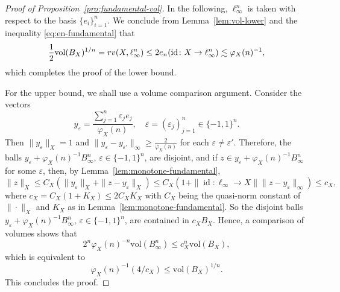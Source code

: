 \documentclass[10pt,a4paper]{amsart}
\DeclareMathOperator{\id}{id}
\newcommand{\vol}{\mathrm{vol}}
\begin{document}
\begin{proof}[Proof of Proposition~\ref{pro:fundamental-vol}]

In the following, $\ell_{\infty}^n$ is taken with respect to the basis $\{e_i\}_{i=1}^n$. We conclude from Lemma~\ref{lem:vol-lower} and the inequality \eqref{eq:en-fundamental} that
\[
\frac{1}{2}\vol(B_X)^{1/n}
={\rm rv}(X,\ell_{\infty}^n)
\le 2 e_n(\id\colon X\to \ell_{\infty}^n)
\lesssim \varphi_X(n)^{-1},
\]
which completes the proof of the lower bound.

For the upper bound, we shall use a volume comparison argument. Consider the vectors 
\[
y_{\varepsilon}=\frac{\sum_{j=1}^{n}\varepsilon_je_j}{\varphi_X(n)} ,\quad \varepsilon=(\varepsilon_j)_{j=1}^n\in \{-1,1\}^n.
\]
Then $\|y_{\varepsilon}\|_X=1$ and $\|y_{\varepsilon}-y_{\varepsilon'}\|_{\infty}\ge \frac{2}{\varphi_X(n)}$ for each $\varepsilon\neq \varepsilon'$. Therefore, the balls $y_{\varepsilon}+\varphi_X(n)^{-1}B_{\infty}^n$, $\varepsilon\in\{-1,1\}^n$, are disjoint, and if $z\in y_{\varepsilon}+\varphi_X(n)^{-1}B_{\infty}^n$ for some $\varepsilon$, then, by Lemma~\ref{lem:monotone-fundamental}, 
\[
\|z\|_X
\le C_X(\|y_{\varepsilon}\|_X + \|z-y_{\varepsilon}\|_X)
\le C_X(1 + \|\id\colon \ell_{\infty}\to X \|\|z-y_{\varepsilon}\|_{\infty})
\le c_X,
\]
where $c_X=C_X(1+K_X)\le 2C_X K_X$ with $C_X$ being the quasi-norm constant of $\|\cdot\|_X$ and $K_X$ as in Lemma~\ref{lem:monotone-fundamental}.
So the disjoint balls $y_{\varepsilon}+\varphi_X(n)^{-1}B_{\infty}^n$, $\varepsilon\in\{-1,1\}^n$, are contained in $c_X B_{X}$. Hence, a comparison of volumes shows that
\[
 2^n\varphi_X(n)^{-n}\vol(B_{\infty}^n) \le  c_X^n \vol(B_X),
\]
which is equivalent to
\[
\varphi_X(n)^{-1} (4/c_X )\le \vol(B_X)^{1/n}.
\]
This concludes the proof.
\end{proof}
\end{document}
